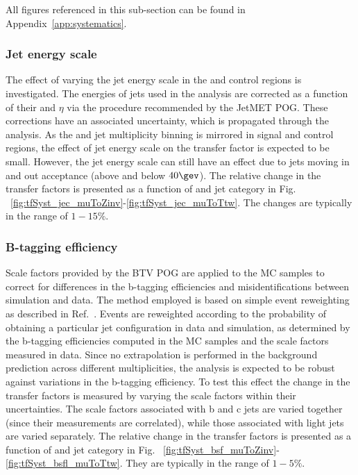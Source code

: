 All figures referenced in this sub-section can be found in Appendix~\ref{app:systematics}.

\subsubsection*{Jet energy scale}
\label{sec:tfSyst_jec}
The effect of varying the jet energy scale in
the \mj and \mmj control regions is investigated.  The energies of
jets used in the analysis are corrected as a function of their \pt and
$\eta$ via the procedure recommended by the JetMET POG. These
corrections have an associated uncertainty, which is propagated through the analysis. 
As the \scalht and jet multiplicity binning is mirrored in signal and control regions, 
the effect of jet energy scale on the transfer factor is expected to be small. 
However, the jet energy scale can still have an
effect due to jets moving in and out acceptance (above and below
$40\gev$). The relative change in the transfer factors is presented as a function of \scalht and jet category 
in Fig. ~\ref{fig:tfSyst_jec_muToZinv}-\ref{fig:tfSyst_jec_muToTtw}.
The changes are typically in the range of $1-15\%$.

\subsubsection*{B-tagging efficiency}
\label{sec:tfSyst_btag}

Scale factors provided by the BTV POG are applied to the MC samples
to correct for differences in the b-tagging efficiencies and 
misidentifications between simulation and data. 
The method employed is based on simple event reweighting as described in
Ref.~\cite{btagSFMethods}. 
Events are reweighted according to the probability of obtaining a particular jet configuration in data
and simulation, as determined by the b-tagging efficiencies computed
in the MC samples and the scale factors measured in data.
Since no extrapolation is performed in the background prediction across different 
\nb multiplicities, the analysis is expected to be robust against variations in the 
b-tagging efficiency. 
To test this effect the change in the transfer factors is measured
by varying the scale factors within their uncertainties. The scale factors
associated with b and c jets are varied together (since their measurements are
correlated), while those associated with light jets are varied separately.
The relative change in the transfer factors is presented as a function of \scalht and jet category 
in Fig. ~\ref{fig:tfSyst_bsf_muToZinv}-\ref{fig:tfSyst_bsfl_muToTtw}.
They are typically in the range of $1-5\%$.

